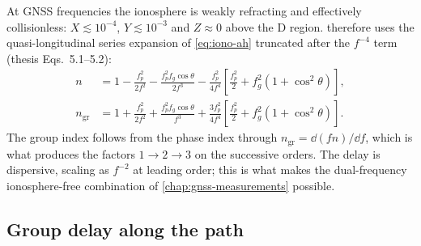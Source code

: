 At GNSS frequencies the ionosphere is weakly refracting and effectively
collisionless: $X \lesssim 10^{-4}$, $Y \lesssim 10^{-3}$ and $Z \approx 0$ above
the D region.  \lupnt{} therefore uses the quasi-longitudinal series expansion of
\cref{eq:iono-ah} truncated after the $f^{-4}$ term (thesis Eqs.~5.1--5.2):
%
\begin{align}
  \label{eq:iono-phase-index}
  n &= 1
     - \frac{f_p^2}{2f^2}
     - \frac{f_p^2 f_g \cos\theta}{2f^3}
     - \frac{f_p^2}{4f^4}\!\left[\frac{f_p^2}{2} + f_g^2\left(1+\cos^2\theta\right)\right] , \\[4pt]
  \label{eq:iono-group-index}
  n_\mathrm{gr} &= 1
     + \frac{f_p^2}{2f^2}
     + \frac{f_p^2 f_g \cos\theta}{f^3}
     + \frac{3f_p^2}{4f^4}\!\left[\frac{f_p^2}{2} + f_g^2\left(1+\cos^2\theta\right)\right] .
\end{align}
%
The group index follows from the phase index through
$n_\mathrm{gr} = \dd(fn)/\dd f$, which is what produces the factors
$1 \to 2 \to 3$ on the successive orders.  The delay is dispersive, scaling as
$f^{-2}$ at leading order; this is what makes the dual-frequency
ionosphere-free combination of \cref{chap:gnss-measurements} possible.

\subsection{Group delay along the path}
\label{sec:iono-groupdelay}


